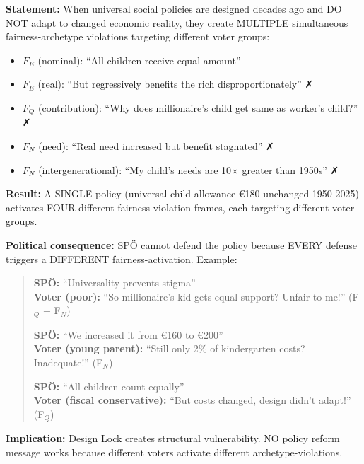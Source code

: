 \begin{tcolorbox}[colback=gray!5!white, colframe=gray!75!black,
    title=Axiom CM-9: Intra-Archetype Conflicts Under Design Lock]

\textbf{Statement:} When universal social policies are designed decades ago and DO NOT adapt
to changed economic reality, they create MULTIPLE simultaneous fairness-archetype violations
targeting different voter groups:

\begin{itemize}[nosep]
\item $F_E$ (nominal): ``All children receive equal amount''
\item $F_E$ (real): ``But regressively benefits the rich disproportionately'' ✗
\item $F_Q$ (contribution): ``Why does millionaire's child get same as worker's child?'' ✗
\item $F_N$ (need): ``Real need increased but benefit stagnated'' ✗
\item $F_N$ (intergenerational): ``My child's needs are 10× greater than 1950s'' ✗
\end{itemize}

\textbf{Result:} A SINGLE policy (universal child allowance €180 unchanged 1950-2025)
activates FOUR different fairness-violation frames, each targeting different voter groups.

\textbf{Political consequence:} SPÖ cannot defend the policy because EVERY defense triggers
a DIFFERENT fairness-activation. Example:

\begin{quote}
\textbf{SPÖ:} ``Universality prevents stigma''
\\
\textbf{Voter (poor):} ``So millionaire's kid gets equal support? Unfair to me!'' (F$_Q$ + F$_N$)

\vspace{0.3em}

\textbf{SPÖ:} ``We increased it from €160 to €200''
\\
\textbf{Voter (young parent):} ``Still only 2\% of kindergarten costs? Inadequate!'' (F$_N$)

\vspace{0.3em}

\textbf{SPÖ:} ``All children count equally''
\\
\textbf{Voter (fiscal conservative):} ``But costs changed, design didn't adapt!'' (F$_Q$)
\end{quote}

\textbf{Implication:} Design Lock creates structural vulnerability. NO policy reform message
works because different voters activate different archetype-violations.

\end{tcolorbox}

